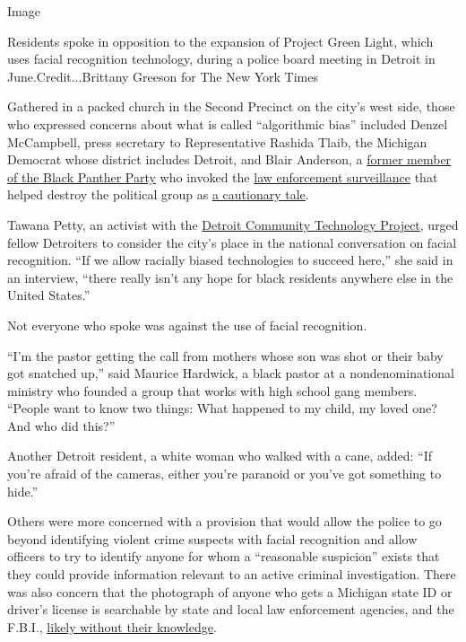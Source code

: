 Image

Residents spoke in opposition to the expansion of Project Green Light,
which uses facial recognition technology, during a police board meeting
in Detroit in June.Credit...Brittany Greeson for The New York Times

Gathered in a packed church in the Second Precinct on the city's west
side, those who expressed concerns about what is called ``algorithmic
bias'' included Denzel McCampbell, press secretary to Representative
Rashida Tlaib, the Michigan Democrat whose district includes Detroit,
and Blair Anderson, a
\href{https://www.nytimes.com/1970/05/09/archives/7-panthers-freed-in-chicago-clash-states-attorney-cites-lack-of.html}{former
member of the Black Panther Party} who invoked the
\href{https://www.intelligence.senate.gov/sites/default/files/94755_II.pdf}{law
enforcement surveillance} that helped destroy the political group as
\href{https://openjurist.org/600/f2d/600/hampton-v-hanrahan}{a
cautionary tale}.

Tawana Petty, an activist with the
\href{https://detroitcommunitytech.org/?q=content/critical-summary-detroit\%E2\%80\%99s-project-green-light-and-its-greater-context}{Detroit
Community Technology Project}, urged fellow Detroiters to consider the
city's place in the national conversation on facial recognition. ``If we
allow racially biased technologies to succeed here,'' she said in an
interview, ``there really isn't any hope for black residents anywhere
else in the United States.''

Not everyone who spoke was against the use of facial recognition.

``I'm the pastor getting the call from mothers whose son was shot or
their baby got snatched up,'' said Maurice Hardwick, a black pastor at a
nondenominational ministry who founded a group that works with high
school gang members. ``People want to know two things: What happened to
my child, my loved one? And who did this?''

Another Detroit resident, a white woman who walked with a cane, added:
``If you're afraid of the cameras, either you're paranoid or you've got
something to hide.''

Others were more concerned with a provision that would allow the police
to go beyond identifying violent crime suspects with facial recognition
and allow officers to try to identify anyone for whom a ``reasonable
suspicion'' exists that they could provide information relevant to an
active criminal investigation. There was also concern that the
photograph of anyone who gets a Michigan state ID or driver's license is
searchable by state and local law enforcement agencies, and the F.B.I.,
\href{https://www.freep.com/story/news/local/michigan/2019/03/11/michigan-state-police-facial-recognition-database/3102139002/}{likely
without their knowledge}.

